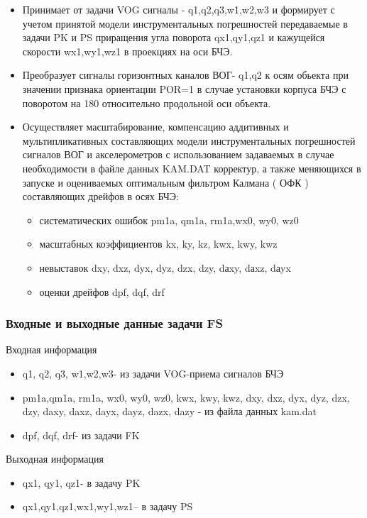 \begin{itemize}
\item Принимает от задачи VOG сигналы - q1,q2,q3,w1,w2,w3 и формирует с учетом принятой модели  инструментальных погрешностей передаваемые в задачи PK и PS  
приращения угла поворота qx1,qy1,qz1 и кажущейся скорости wx1,wy1,wz1 в проекциях на оси БЧЭ.
\item Преобразует сигналы горизонтных каналов ВОГ- q1,q2  к осям обьекта при значении признака ориентации POR=1 в случае установки корпуса БЧЭ 
с поворотом на 180 относительно продольной оси объекта.
\item Осуществляет масштабирование, компенсацию аддитивных и мультипликативных составляющих модели  инструментальных погрешностей   
сигналов ВОГ и акселерометров с использованием задаваемых в случае необходимости в файле данных KAM.DAT корректур, а также меняющихся в запуске 
и  оцениваемых оптимальным фильтром Калмана ( ОФК ) составляющих дрейфов в осях БЧЭ:  
    \begin{itemize}
\item систематических ошибок  pm1a, qm1a, rm1a,wx0, wy0, wz0
\item масштабных коэффициентов kx, ky, kz,  kwx, kwy, kwz
\item невыставок  dxy, dxz, dyx, dyz, dzx, dzy, dаxy, dаxz, dаyx
\item оценки дрейфов dpf, dqf, drf
    \end{itemize}
\end{itemize}
\subsubsection{Входные и выходные данные задачи FS}
Входная информация
\begin{itemize}
    \item q1, q2, q3, w1,w2,w3- из задачи  VOG-приема сигналов БЧЭ
    \item pm1a,qm1a, rm1a, wx0, wy0, wz0, kwx, kwy, kwz, dxy, dxz, dyx, dyz, dzx, dzy, daxy, daxz, dayx, dayz, dazx, dazy - из файла данных kam.dat
    \item dpf, dqf, drf- из задачи  FK
\end{itemize}
Выходная информация
\begin{itemize}
    \item qx1, qy1, qz1- в задачу PK
    \item qx1,qy1,qz1,wx1,wy1,wz1-- в задачу PS
\end{itemize}
\pagebreak
